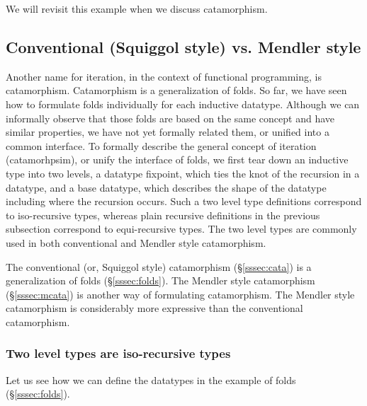 We will revisit this example when we discuss catamorphism.

\subsection{Conventional (Squiggol style) vs. Mendler style}
\label{ssec:Mendler}
Another name for iteration, in the context of functional programming,
is catamorphism. Catamorphism is a generalization of folds. So far, we have
seen how to formulate folds individually for each inductive datatype.
Although we can informally observe that those folds are based on the same
concept and have similar properties, we have not yet formally related them,
or unified into a common interface. To formally describe the general concept
of iteration (\aka catamorhpsim), or unify the interface of folds, we first
tear down an inductive type into two levels, a datatype fixpoint, which ties
the knot of the recursion in a datatype, and a base datatype, which describes
the shape of the datatype including where the recursion occurs. Such a two
level type definitions correspond to iso-recursive types, whereas
plain recursive definitions in the previous subsection correspond to
equi-recursive types. The two level types are commonly used in
both conventional and Mendler style catamorphism.

The conventional (or, Squiggol style) catamorphism (\S\ref{sssec:cata})
is a generalization of folds (\S\ref{sssec:folds}).
The Mendler style catamorphism (\S\ref{sssec:mcata}) is another way of
formulating catamorphism. The Mendler style catamorphism is considerably
more expressive than the conventional catamorphism.

\subsubsection{Two level types are iso-recursive types}
Let us see how we can define the datatypes in the example of folds
(\S\ref{sssec:folds}).


